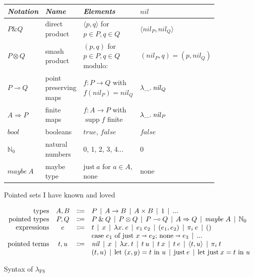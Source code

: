 \documentclass[runningheads]{llncs}
\newcommand\fslang{\ensuremath{\lambda_{\mathrm{FS}}}}
\DeclareMathOperator{\support}{supp}
\newcommand\bnfeq{\Coloneqq}
\newcommand\bnfor{\mathrel{\,|\,}}
\newcommand\name[1]{\ensuremath{\mathit{#1}}}
\newcommand\<\:                 %
\newcommand\fnspace{\<}         %
\newcommand\fn[1]{\lambda{#1}.\fnspace}
\newcommand\lto\multimap        %
\newcommand\fto\Rightarrow
\newcommand\with{\mathbin{\&}}
\newcommand\ox\otimes
\newcommand\typename\textit
\newcommand\bool{\typename{bool}}
\newcommand\maybe{\typename{maybe}}
\newcommand\maybeof[1]{\ensuremath{\maybe~{#1}}}
\newcommand\kword[1]{\ensuremath{\textrm{#1}}}
\newcommand\cname\textrm
\newcommand\cnil{\cname{none}}
\newcommand\cjust{\cname{just}}
\newcommand\nil{\name{nil}}
\newcommand\true{\name{true}}
\newcommand\false{\name{false}}
\newcommand\letin[1]{\kword{let}~{#1}~\kword{in}~}
\newcommand\leteq[2]{\letin{{#1} = {#2}}}
\newcommand\tjust[1]{\cjust\<{#1}}
\newcommand\letjust[3]{\leteq{\tjust {#1}}{#2}{#3}}
\newcommand\letpair[4]{\leteq{({#1}, {#2})}{#3}{#4}}
\newcommand\withpair[1]{\ensuremath{\langle{#1}\rangle}}
\newcommand\ifjust[4]{%
  \kword{case}~{#1}\ \kword{of}\
  \cjust~{#2} \shortrightarrow {#3};\, \cnil \shortrightarrow {#4}%
}
\newcommand\pwild{\text{\textunderscore}}
\newcommand\typeforget{}
\newcommand\termforget[1]{#1}
\newcommand\nat{\mathbb{N}}
\newcommand\natz{\ensuremath{\nat_0}}
\begin{document}
\label{sec:examples}

\begin{figure}[t]
  \begin{center}
    \begin{tabular}{llll}
      \emph{Notation}
      & \emph{Name} & \emph{Elements} & \nil\\\midrule
      $P \with Q$
      & direct product
      & $\withpair{p,q}$ for $p\in P, q \in Q$
      & $\withpair{\nil_P, \nil_Q}$
      \\
      $P \ox Q$
      & smash product
      & \((p,q)\) for \(p \in P, q \in Q\) modulo:
      & \((\nil_P, q) = (p, \nil_Q)\)
      \\
      $P \lto Q$
      & point preserving maps
      & $f : P \to Q$ with $f(\nil_P) = \nil_Q$
      & $\fn{\pwild} \nil_Q$
      \\
      $A \fto P$
      & finite maps
      & $f : A \to P$ with $\support f$ finite
      & $\fn{\pwild} \nil_P$
      \\
      $\bool$
      & booleans
      & \true, \false
      & \false
      \\
      $\natz$
      & natural numbers
      & 0, 1, 2, 3, 4...
      & 0
      \\
      $\maybeof A$
      & maybe type
      & $\tjust a$ for $a \in A$, \cnil
      & \cnil
    \end{tabular}
  \end{center}
  \vspace{-0.25\baselineskip}
  \caption{Pointed sets I have known and loved}
  \label{fig:pointed-sets}
  \vspace{0.5\baselineskip}     %
\end{figure}

\begin{figure}[t]
  \[
  \begin{array}{rccll}
    \text{types} & A,B &\bnfeq&
    \typeforget P \bnfor A \to B \bnfor A \times B \bnfor 1 \bnfor ...\\
    \text{pointed types} & P,Q &\bnfeq&
    P \with Q \bnfor P \ox Q \bnfor P \lto Q \bnfor A \fto Q
    \bnfor \maybeof A
    \bnfor \natz
    \\
    \text{expressions} & e &\bnfeq&
    \termforget t
    \bnfor x \bnfor \fn x e \bnfor e_1 \<e_2
    \bnfor (e_1, e_2) \bnfor \pi_i \<e \bnfor ()
    \\&&&
    \ifjust{e_1}{x}{e_2}{e_3}
    \bnfor ...
    \\
    \text{pointed terms} & t,u &\bnfeq&
    \nil
    \bnfor x \bnfor \fn{x} t \bnfor t\<u
    \bnfor t\<x \bnfor t\<e
    \bnfor \withpair{t, u} \bnfor \pi_i \<t
    \\
    &&& (t,u) \bnfor \letpair x y t u
    \bnfor \tjust e \bnfor \letjust x t u
  \end{array}
  \]
  \caption{Syntax of \fslang}
  \label{fig:syntax}
\end{figure}
\end{document}

